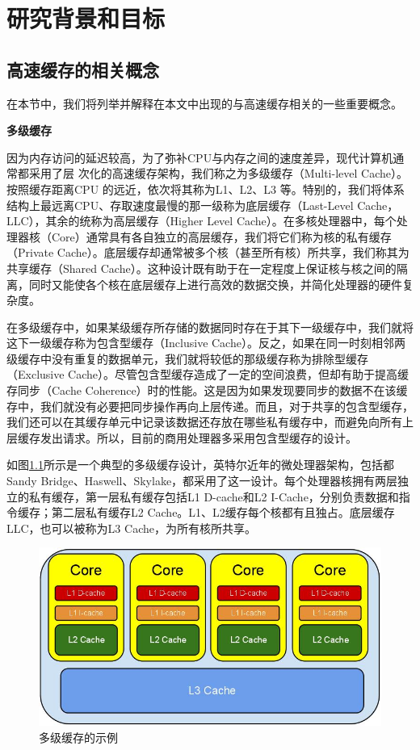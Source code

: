 
\chapter{研究背景和目标} \label{chap:related}
\section{高速缓存的相关概念}
在本节中，我们将列举并解释在本文中出现的与高速缓存相关的一些重要概念。

\textbf{多级缓存}

因为内存访问的延迟较高，为了弥补CPU与内存之间的速度差异，现代计算机通常都采用了层
次化的高速缓存架构，我们称之为多级缓存（Multi-level Cache）。按照缓存距离CPU 的远近，依次将其称为L1、L2、L3 等。特别的，我们将体系结构上最远离CPU、存取速度最慢的那一级称为底层缓存（Last-Level Cache，LLC），其余的统称为高层缓存（Higher Level Cache）。在多核处理器中，每个处理器核（Core）通常具有各自独立的高层缓存，我们将它们称为核的私有缓存（Private Cache）。底层缓存却通常被多个核（甚至所有核）所共享，我们称其为共享缓存（Shared Cache）。这种设计既有助于在一定程度上保证核与核之间的隔离，同时又能使各个核在底层缓存上进行高效的数据交换，并简化处理器的硬件复杂度。

在多级缓存中，如果某级缓存所存储的数据同时存在于其下一级缓存中，我们就将这下一级缓存称为包含型缓存（Inclusive Cache）。反之，如果在同一时刻相邻两级缓存中没有重复的数据单元，我们就将较低的那级缓存称为排除型缓存（Exclusive Cache）。尽管包含型缓存造成了一定的空间浪费，但却有助于提高缓存同步（Cache Coherence）时的性能。这是因为如果发现要同步的数据不在该缓存中，我们就没有必要把同步操作再向上层传递。而且，对于共享的包含型缓存，我们还可以在其缓存单元中记录该数据还存放在哪些私有缓存中，而避免向所有上层缓存发出请求。所以，目前的商用处理器多采用包含型缓存的设计。

如图\ref{fig:cache_hierarchy}所示是一个典型的多级缓存设计，英特尔近年的微处理器架构，包括都Sandy Bridge、Haswell、Skylake，都采用了这一设计。每个处理器核拥有两层独立的私有缓存，第一层私有缓存包括L1 D-cache和L2 I-Cache，分别负责数据和指令缓存；第二层私有缓存L2 Cache。L1、L2缓存每个核都有且独占。底层缓存LLC，也可以被称为L3 Cache，为所有核所共享。

\begin{figure}[htbp] 
    \centering
    \includegraphics[width=0.8\linewidth]{figures/CacheHierarchy.jpg}
    \caption{多级缓存的示例}
    \label{fig:cache_hierarchy}
\end{figure}


